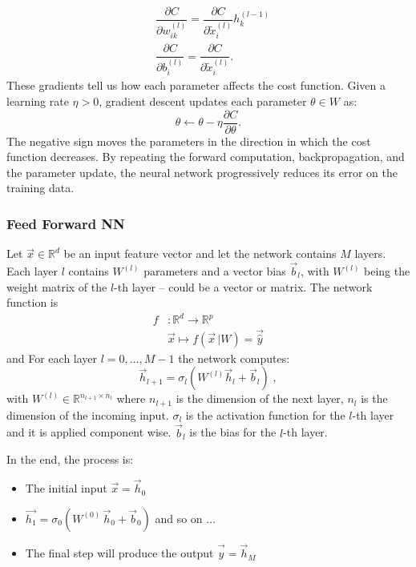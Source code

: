 \documentclass[12pt,a4paper]{article}
\begin{document}
\begin{align*}
	&\dfrac{\partial C}{\partial w_{ik}^{(l)}}
	=
	\dfrac{\partial C}{\partial \tilde{x}_i^{(l)}}h_k^{(l-1)}
	\\[10pt]
	&\dfrac{\partial C}{\partial b_i^{(l)}}
	=
	\dfrac{\partial C}{\partial \tilde{x}_i^{(l)}}.
\end{align*}
These gradients tell us how each parameter affects the cost function. Given a learning rate $\eta>0$, gradient descent updates each parameter $\theta \in W$ as:
\begin{equation*}
	\theta
	\leftarrow
	\theta
	-
	\eta
	\dfrac{\partial C}{\partial \theta}.
\end{equation*}
The negative sign moves the parameters in the direction in which the cost function decreases. By repeating the forward computation, backpropagation, and the parameter update, the neural network progressively reduces its error on the training data.


\subsubsection*{Feed Forward NN}
Let $\vec{x}\in \mathbb{R}^d$ be an input feature vector and let the network contains $M$ layers. Each layer $l$ contains $W^{(l)}$ parameters and a vector bias $\vec{b}_l$, with $W^{(l)}$ being the weight matrix of the $l$-th layer -- could be a vector or matrix.
The network function is
\begin{align*}
	f &: \mathbb{R}^d \to \mathbb{R}^p\\
	&\vec{x} \mapsto f(\vec{x} \,| W) = \vec{\hat{y}}
\end{align*}
and For each layer $l=0,\ldots,M-1$ the network computes:
$$
\vec{h}_{l+1} = \sigma_l(W^{(l)} \vec{h}_l +\vec{b}_l)\;,
$$
with $W^{(l)}\in \mathbb{R}^{n_{l+1}\times n_{l}}$ where $n_{l+1}$ is the dimension of the next layer, $n_l$ is the dimension of the incoming input. $\sigma_l$ is the activation function for the $l$-th layer and it is applied component wise. $\vec{b}_l$ is the bias for the $l$-th layer.

In the end, the process is:
\begin{itemize}
	\item[1.] The initial input $\vec{x} = \vec{h}_0$
	\item[2.] $\vec{h_1} = \sigma_0 (W^{(0)} \, \vec{h}_0 + \vec{b}_0)$ and so on ...
	\item[3.] The final step will produce the output $\vec{\hat{y}} = \vec{h}_M$ 
\end{itemize}
\end{document}
